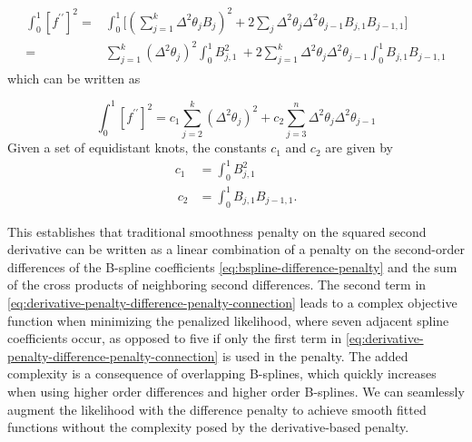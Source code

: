 \begin{align}
\begin{split}
\int_0^1 \left[ f^{\prime \prime}\right]^2  = {} &  \int_0^1 \bigg[ \left( \sum\limits_{j=1}^k   \Delta^2 \theta_j  B_j \right)^2  + 2 \sum_{j}\Delta^2 \theta_j\Delta^2 \theta_{j-1}B_{j,1}B_{j-1,1} \bigg]\\ 
= {} & \sum \limits_{j=1}^k  \left( \Delta^2\theta_j \right)^2 \int_0^1 B_{j,1}^2\ + 2 \sum\limits_{j=1}^k \Delta^2 \theta_j\Delta^2 \theta_{j-1} \int_0^1 B_{j,1}B_{j-1,1} 
\end{split}
\end{align}
\noindent
which can be written as

\begin{equation} \label{eq:derivative-penalty-difference-penalty-connection}
\int_0^1 \left[ f^{\prime \prime}\right]^2  = c_1 \sum\limits_{j=2}^k \left( \Delta^2 \theta_j\right)^2 + c_2 \sum\limits_{j=3}^n \Delta^2 \theta_j\Delta^2 \theta_{j-1}
\end{equation}
\noindent
Given a set of equidistant knots, the constants $c_1$ and $c_2$ are given by
\begin{equation}
\begin{split}
c_1 & =   \int_0^1 B_{j,1}^2\\\
c_2 & = \int_0^1 B_{j,1}B_{j-1,1}.
\end{split}
\end{equation}


This establishes that traditional smoothness penalty on the squared second derivative can be written as a linear combination of a penalty on the second-order differences of the B-spline coefficients \ref{eq:bspline-difference-penalty} and the sum of the cross products of neighboring second differences. The second term in \ref{eq:derivative-penalty-difference-penalty-connection} leads to a complex objective function when minimizing the penalized likelihood, where seven adjacent spline coefficients occur, as opposed to five if only the first term in \ref{eq:derivative-penalty-difference-penalty-connection} is used in the penalty. The added complexity is a consequence of overlapping B-splines, which quickly increases when using higher order differences and higher order B-splines. We can seamlessly augment the likelihood with the difference penalty to achieve smooth fitted functions without the complexity posed by the derivative-based penalty.

\bigskip

